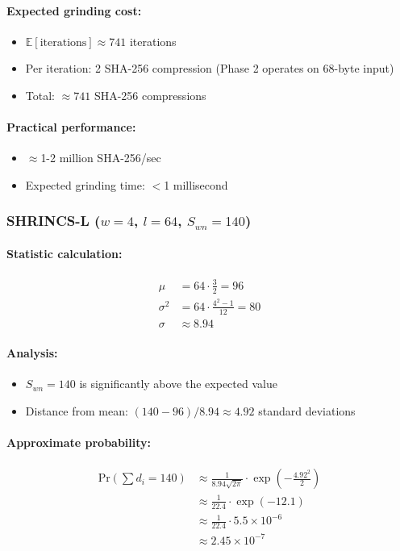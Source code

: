 \paragraph{Expected grinding cost:}
\begin{itemize}
    \item $\mathbb{E}[\text{iterations}] \approx 741$ iterations
    \item Per iteration: 2 SHA-256 compression (Phase 2 operates on 68-byte input)
    \item Total: $\approx 741$ SHA-256 compressions
\end{itemize}

\paragraph{Practical performance:}
\begin{itemize}
    \item $\approx$1-2 million SHA-256/sec
    \item Expected grinding time: $<$1 millisecond
\end{itemize}

\subsubsection{SHRINCS-L ($w=4$, $l=64$, $S_{wn}=140$)}

\paragraph{Statistic calculation:}
\begin{align}
    \mu &= 64 \cdot \frac{3}{2} = 96 \\
    \sigma^2 &= 64 \cdot \frac{4^2-1}{12} = 80 \\
    \sigma &\approx 8.94
\end{align}

\paragraph{Analysis:}
\begin{itemize}
    \item $S_{wn} = 140$ is significantly above the expected value
    \item Distance from mean: $(140 - 96)/8.94 \approx 4.92$ standard deviations
\end{itemize}

\paragraph{Approximate probability:}
\begin{align}
    \text{Pr}\left(\sum d_i = 140\right) &\approx \frac{1}{8.94\sqrt{2\pi}} \cdot \exp\left(-\frac{4.92^2}{2}\right) \nonumber \\
    &\approx \frac{1}{22.4} \cdot \exp(-12.1) \nonumber \\
    &\approx \frac{1}{22.4} \cdot 5.5 \times 10^{-6} \nonumber \\
    &\approx 2.45 \times 10^{-7}
\end{align}

